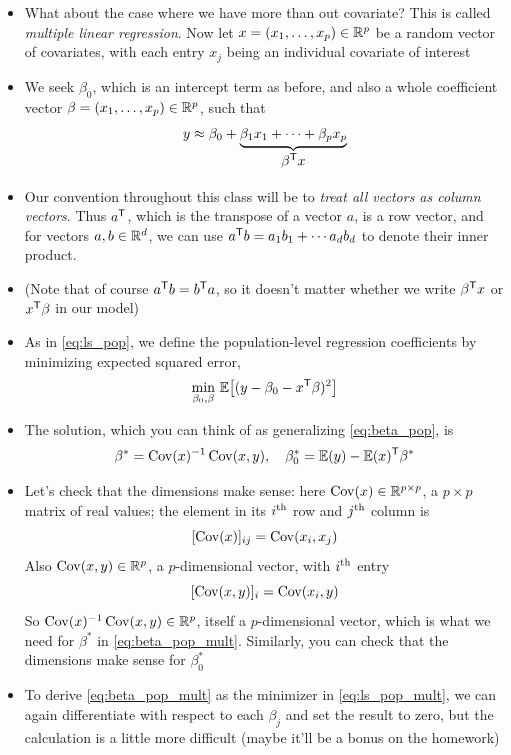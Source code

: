 \documentclass{article}
\begin{document}
\begin{itemize}
\item What about the case where we have more than out covariate? This is called
  \emph{multiple linear regression}. Now let $x = (x_1, \dots, x_p) \in \mathbb{R}^p$
  be a random vector of covariates, with each entry $x_j$ being an individual
  covariate of interest

\item We seek $\beta_0$, which is an intercept term as before, and also a whole 
  coefficient vector $\beta = (x_1, \dots, x_p) \in \mathbb{R}^p$, such that 
  \[
  y \approx \beta_0 + \underbrace{\beta_1 x_1 + \cdots + \beta_p
    x_p}_{\textstyle \begin{array}{c} \beta^{\mathsf{T}} x \end{array}}
  \]

\item Our convention throughout this class will be to \emph{treat all vectors as 
    column vectors}. Thus $a^{\mathsf{T}}$, which is the transpose of a vector $a$, is a
  row vector, and for vectors $a,b \in \mathbb{R}^d$, we can use $a^{\mathsf{T}} b = a_1 b_1 +
  \cdots a_d b_d$ to denote their inner product. 

\item (Note that of course $a^{\mathsf{T}} b = b^{\mathsf{T}} a$, so it doesn't matter whether we
  write $\beta^{\mathsf{T}} x$ or $x^{\mathsf{T}} \beta$ in our model)

\item As in \eqref{eq:ls_pop}, we define the population-level regression
  coefficients by minimizing expected squared error,   
  \begin{equation}
  \label{eq:ls_pop_mult}
  \min_{\beta_0, \beta} \, \mathbb{E}\big[ (y - \beta_0 - x^{\mathsf{T}} \beta)^2 \big]
  \end{equation}

\item The solution, which you can think of as generalizing \eqref{eq:beta_pop},
  is 
  \begin{equation}
  \label{eq:beta_pop_mult}
  \beta^* = \operatorname{Cov}(x)^{-1} \operatorname{Cov}(x, y), \quad 
  \beta^*_0 = \mathbb{E}(y) - \mathbb{E}(x)^{\mathsf{T}} \beta^*
  \end{equation}

\item Let's check that the dimensions make sense: here $\operatorname{Cov}(x) \in \mathbb{R}^{p
    \times  p}$, a $p \times p$ matrix of real values; the element in its $i^{\textnormal{th}}$
  row and $j^{\textnormal{th}}$ column is   
  \[
  [\operatorname{Cov}(x)]_{ij} = \operatorname{Cov}(x_i, x_j)
  \]
  Also $\operatorname{Cov}(x, y) \in \mathbb{R}^p$, a $p$-dimensional vector, with $i^{\textnormal{th}}$ entry
  \[
  [\operatorname{Cov}(x, y)]_i = \operatorname{Cov}(x_i, y)
  \]
  So $\operatorname{Cov}(x)^{-1} \operatorname{Cov}(x, y) \in \mathbb{R}^p$, itself a $p$-dimensional vector, which
  is what we need for $\beta^*$ in \eqref{eq:beta_pop_mult}. Similarly, you can
  check that the dimensions make sense for $\beta^*_0$ 

\item To derive \eqref{eq:beta_pop_mult} as the minimizer in
  \eqref{eq:ls_pop_mult}, we can again differentiate with respect to each
  $\beta_j$ and set the result to zero, but the calculation is a little more
  difficult (maybe it'll be a bonus on the homework) 
\end{itemize}
\end{document}
